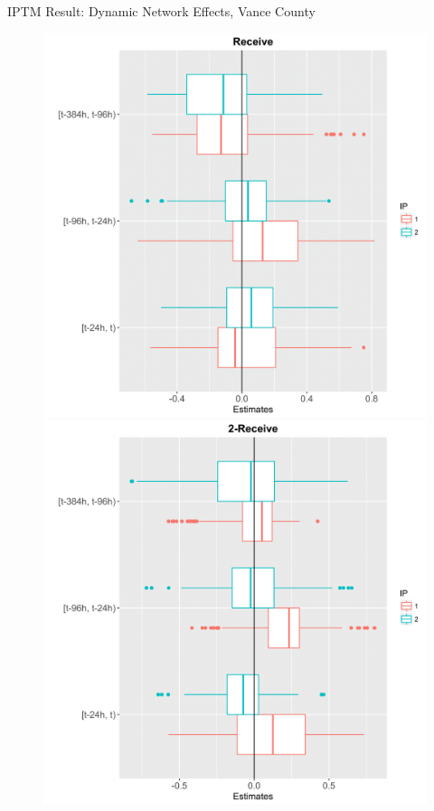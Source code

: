 \documentclass[10pt]{beamer}
\theoremstyle{definition}
\theoremstyle{remark}
\begin{document}
\begin{frame}{IPTM Result: Dynamic Network Effects, Vance County}

	\begin{figure}
		\includegraphics[width=.5\textwidth]{figures/VanceBReceive-1.png} \includegraphics[width=.5\textwidth]{figures/Vance2Receive-1.png}
	\end{figure}	
\end{frame}
\end{document}

